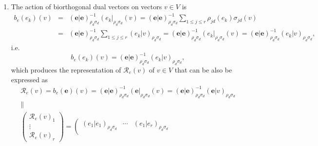 \documentclass[aps,preprint]{revtex4}
\begin{document}
\begin{enumerate}
\begin{enumerate}
\item The action of biorthogonal dual vectors on vectors $v\in V$ is 
\begin{eqnarray}
b_{e}\left( e_{k}\right) \left( v\right) &=&\left( \left. \boldsymbol{e}%
\right\vert \boldsymbol{e}\right) _{\rho _{d}\sigma _{d}}^{-1}\left(
e_{k}\right\vert _{\rho _{d}\sigma _{d}}\left( v\right) =\left( \left. 
\boldsymbol{e}\right\vert \boldsymbol{e}\right) _{\rho _{d}\sigma
_{d}}^{-1}\sum_{1\leq j\leq r}\rho _{jd}\left( e_{k}\right) \sigma
_{jd}\left( v\right) \\
&=&\left( \left. \boldsymbol{e}\right\vert \boldsymbol{e}\right) _{\rho
_{d}\sigma _{d}}^{-1}\sum_{1\leq j\leq r}\left( \left. e_{k}\right\vert
v\right) _{\rho _{d}\sigma _{d}}=\left( \left. \boldsymbol{e}\right\vert 
\boldsymbol{e}\right) _{\rho _{d}\sigma _{d}}^{-1}\left( e_{k}\right\vert
_{\rho _{d}\sigma _{d}}\left( v\right) =\left( \left. \boldsymbol{e}%
\right\vert \boldsymbol{e}\right) _{\rho _{d}\sigma _{d}}^{-1}\left( \left.
e_{k}\right\vert v\right) _{\rho _{d}\sigma _{d}},
\end{eqnarray}%
i.e. 
\begin{equation}
b_{e}\left( e_{k}\right) \left( v\right) =\left( \left. \boldsymbol{e}%
\right\vert \boldsymbol{e}\right) _{\rho _{d}\sigma _{d}}^{-1}\left( \left.
e_{k}\right\vert v\right) _{\rho _{d}\sigma _{d}},
\end{equation}%
which produces the representation of $\mathcal{R}_{e}\left( v\right) $ of $%
v\in V$ that can be also be expressed as 
\begin{gather}
\mathcal{R}_{e}\left( v\right) =b_{e}\left( \boldsymbol{e}\right) \left(
v\right) =\left( \left. \boldsymbol{e}\right\vert \boldsymbol{e}\right)
_{\rho _{d}\sigma _{d}}^{-1}\left( \boldsymbol{e}\right\vert _{\rho
_{d}\sigma _{d}}\left( v\right) =\left( \left. \boldsymbol{e}\right\vert 
\boldsymbol{e}\right) _{\rho _{d}\sigma _{d}}^{-1}\left( \left. \boldsymbol{e%
}\right\vert v\right) _{\rho _{d}\sigma _{d}} \\
\parallel \\
\left( 
\begin{array}{c}
\mathcal{R}_{e}\left( v\right) _{1} \\ 
\vdots \\ 
\mathcal{R}_{e}\left( v\right) _{r}%
\end{array}%
\right) =\left( 
\begin{array}{ccc}
\left( \left. e_{1}\right\vert e_{1}\right) _{\rho _{d}\sigma _{d}} & \cdots
& \left( \left. e_{1}\right\vert e_{r}\right) _{\rho _{d}\sigma _{d}} \\ 

\end{array}
\end{gather}
\end{enumerate}
\end{enumerate}
\end{document}
